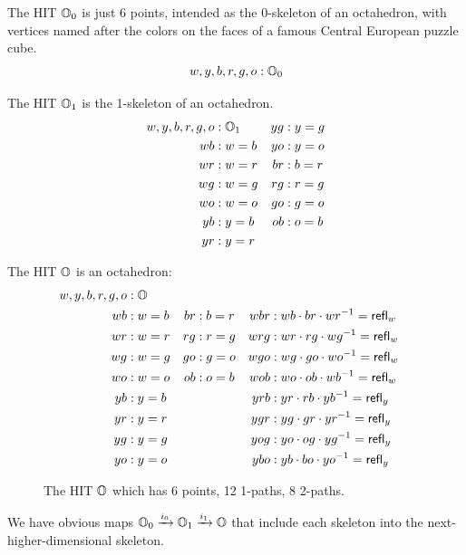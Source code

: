 \begin{mydef}
The HIT \( \mathbb{O}_0 \) is just 6 points, intended as the 0-skeleton of an octahedron, with vertices named after the colors on the faces of a famous Central European puzzle cube.
\[ w, y, b, r, g, o : \mathbb{O}_0 \]
\end{mydef}

\begin{mydef}
The HIT \( \mathbb{O}_1 \) is the 1-skeleton of an octahedron.
\begin{align*}
w, y, b, r, g, o &: \mathbb{O}_1 & yg &: y=g \\
wb &: w=b & yo &: y=o \\
wr &: w=r & br &: b=r \\
wg &: w=g & rg &: r=g \\
wo &: w=o & go &: g=o \\
yb &: y=b & ob &: o=b \\
yr &: y=r
\end{align*}
\end{mydef}

\begin{mydef}
The HIT \( \mathbb{O} \) is an octahedron:
\begin{align*}
w, y, b, r, g, o &: \mathbb{O} \\
wb &: w=b & br &: b=r & wbr &: wb\cdot br\cdot wr^{-1} = \mathsf{refl}_w \\
wr &: w=r & rg &: r=g & wrg &: wr\cdot rg\cdot wg^{-1} = \mathsf{refl}_w \\
wg &: w=g & go &: g=o & wgo &: wg\cdot go\cdot wo^{-1} = \mathsf{refl}_w \\
wo &: w=o & ob &: o=b & wob &: wo\cdot ob\cdot wb^{-1} = \mathsf{refl}_w \\
yb &: y=b & & & yrb &: yr\cdot rb\cdot yb^{-1} = \mathsf{refl}_y \\
yr &: y=r & & & ygr &: yg\cdot gr\cdot yr^{-1} = \mathsf{refl}_y \\
yg &: y=g & & & yog &: yo\cdot og\cdot yg^{-1} = \mathsf{refl}_y \\
yo &: y=o & & & ybo &: yb\cdot bo\cdot yo^{-1} = \mathsf{refl}_y 
\end{align*}
\end{mydef}

\begin{figure}[htbp]
\centering

\caption{The HIT \( \mathbb{O} \) which has 6 points, 12 1-paths, 8 2-paths.}
\end{figure}

We have obvious maps \( \mathbb{O}_0\xrightarrow[]{i_0} \mathbb{O}_1\xrightarrow[]{i_1} \mathbb{O} \) that include each skeleton into the next-higher-dimensional skeleton.

